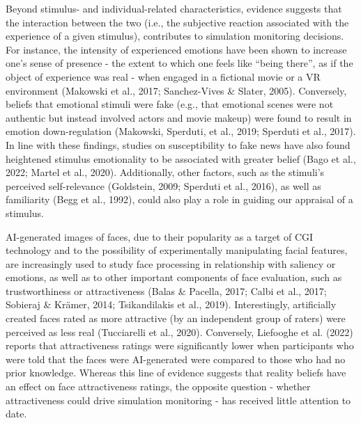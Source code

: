 \documentclass[
  man,mask,floatsintext]{apa6}
\begin{document}
Beyond stimulus- and individual-related characteristics, evidence suggests that the interaction between the two (i.e., the subjective reaction associated with the experience of a given stimulus), contributes to simulation monitoring decisions. For instance, the intensity of experienced emotions have been shown to increase one's sense of presence - the extent to which one feels like ``being there'', as if the object of experience was real - when engaged in a fictional movie or a VR environment (Makowski et al., 2017; Sanchez-Vives \& Slater, 2005). Conversely, beliefs that emotional stimuli were fake (e.g., that emotional scenes were not authentic but instead involved actors and movie makeup) were found to result in emotion down-regulation (Makowski, Sperduti, et al., 2019; Sperduti et al., 2017). In line with these findings, studies on susceptibility to fake news have also found heightened stimulus emotionality to be associated with greater belief (Bago et al., 2022; Martel et al., 2020). Additionally, other factors, such as the stimuli's perceived self-relevance (Goldstein, 2009; Sperduti et al., 2016), as well as familiarity (Begg et al., 1992), could also play a role in guiding our appraisal of a stimulus.

AI-generated images of faces, due to their popularity as a target of CGI technology and to the possibility of experimentally manipulating facial features, are increasingly used to study face processing in relationship with saliency or emotions, as well as to other important components of face evaluation, such as trustworthiness or attractiveness (Balas \& Pacella, 2017; Calbi et al., 2017; Sobieraj \& Krämer, 2014; Tsikandilakis et al., 2019). Interestingly, artificially created faces rated as more attractive (by an independent group of raters) were perceived as less real (Tucciarelli et al., 2020). Conversely, Liefooghe et al. (2022) reports that attractiveness ratings were significantly lower when participants who were told that the faces were AI-generated were compared to those who had no prior knowledge. Whereas this line of evidence suggests that reality beliefs have an effect on face attractiveness ratings, the opposite question - whether attractiveness could drive simulation monitoring - has received little attention to date.
\end{document}
